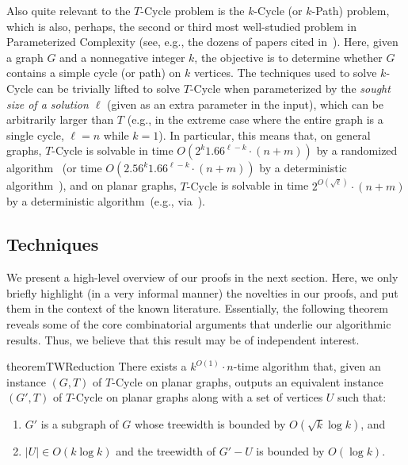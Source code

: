 \documentclass{article}
\numberwithin{claimcounter}{lemma}
\begin{document}
Also quite relevant to the {\sc $T$-Cycle} problem is the {\sc $k$-Cycle} (or {\sc $k$-Path}) problem, which is also, perhaps, the second or third most well-studied problem in Parameterized Complexity (see, e.g., the dozens of papers cited in~\cite{DBLP:conf/soda/LokshtanovSZ21}). Here, given a graph $G$ and a nonnegative integer $k$, the objective is to determine whether $G$ contains a simple cycle (or path) on $k$ vertices. The techniques used to solve {\sc $k$-Cycle} can be trivially lifted to solve {\sc $T$-Cycle} when parameterized by the {\em sought size of a solution $\ell$} (given as an extra parameter in the input), which can be arbitrarily larger than $T$ (e.g., in the extreme case where the entire graph is a single cycle, $\ell=n$ while $k=1$). In particular, this means that, on general graphs, {\sc $T$-Cycle} is solvable in time $O(2^k 1.66^{\ell-k}\cdot (n+m))$ by a randomized algorithm~\cite{DBLP:journals/jcss/BjorklundHKK17} (or time $O(2.56^k 1.66^{\ell-k}\cdot (n+m))$ by a deterministic algorithm~\cite{DBLP:journals/tcs/Tsur19b}), and on planar graphs,  {\sc $T$-Cycle} is solvable in time $2^{O(\sqrt{\ell})}\cdot (n+m)$ by a deterministic algorithm~(e.g., via~\cite{DBLP:journals/jcss/DornFT12}).



\subsection{Techniques} We present a high-level overview of our proofs in the next section. Here, we only briefly highlight (in a very informal manner) the novelties in our proofs, and put them in the context of the known literature.  Essentially, the following theorem reveals some of the core combinatorial arguments that underlie our algorithmic results. Thus, we believe that this result may be of independent interest. 

\begin{restatable}{theorem}{TWReduction}\label{thm:twreduction}
There exists a $k^{O(1)}\cdot n$-time algorithm that, given an instance $(G,T)$ of {\sc $T$-Cycle} on planar graphs, outputs an equivalent instance $(G',T)$ of {\sc $T$-Cycle} on planar graphs along with a set of vertices $U$ such that:
\begin{enumerate}
\item $G'$ is a subgraph of $G$ whose treewidth is bounded by $O(\sqrt{k}\log k)$, and
\item $|U|\in O(k\log k)$ and the treewidth of $G'-U$ is bounded by $O(\log k)$.
\end{enumerate}
\end{restatable}
\end{document}

